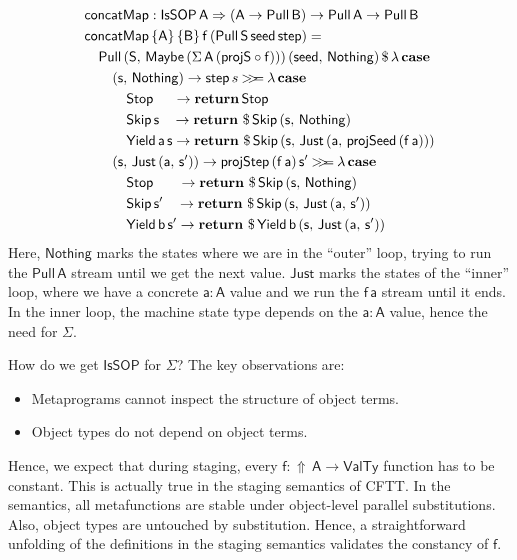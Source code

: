 \documentclass[acmsmall,screen,review,anonymous]{acmart}
\newcommand{\mit}[1]{{\mathsf{#1}}}
\newcommand{\msf}[1]{{\mathsf{#1}}}
\newcommand{\mbf}[1]{{\mathbf{#1}}}
\newcommand{\ind}{\hspace{1em}}
\newcommand{\return}{\mbf{return}\,}
\newcommand{\lam}{\lambda\,}
\newcommand{\vA}{\mathsf{A}}
\newcommand{\vB}{\mathsf{B}}
\newcommand{\vS}{\mathsf{S}}
\newcommand{\va}{\mathsf{a}}
\newcommand{\vb}{\mathsf{b}}
\newcommand{\vf}{\mathsf{f}}
\newcommand{\vs}{\mathsf{s}}
\newcommand{\IsSOP}{\msf{IsSOP}}
\newcommand{\case}{\mbf{case\,}}
\newcommand{\concatMap}{\msf{concatMap}}
\newcommand{\Lift}{{\Uparrow}}
\newcommand{\bind}{\mathbin{>\!\!>\mkern-6.7mu=}}
\newcommand{\VTy}{\msf{ValTy}}
\newcommand{\Maybe}{\msf{Maybe}}
\newcommand{\Nothing}{\msf{Nothing}}
\newcommand{\Just}{\msf{Just}}
\theoremstyle{remark}
\newcommand{\RA}{\Rightarrow}
\newcommand{\Stop}{\msf{Stop}}
\newcommand{\Skip}{\msf{Skip}}
\newcommand{\Yield}{\msf{Yield}}
\newcommand{\dlr}{\,\$\,}
\newcommand{\seed}{\mit{seed}}
\newcommand{\step}{\mit{step}}
\newcommand{\Pull}{\msf{Pull}}
\begin{document}
\begin{alignat*}{3}
  & \concatMap : \IsSOP\,\vA \RA (\vA \to \Pull\,\vB) \to \Pull\,\vA \to \Pull\,\vB \\
  & \concatMap\,\{\vA\}\,\{\vB\}\,\vf\,(\Pull\,\vS\,\seed\,\step) = \\
  & \ind \Pull\,(\vS,\,\Maybe\,(\Sigma\,\vA\,(\mit{projS} \circ \vf)))\,(\seed,\,\Nothing) \dlr \lam \case \\
  & \ind \ind (\vs,\,\Nothing) \to \step\,s \bind \lam \case \\
  & \ind \ind \ind \Stop      \hspace{1.4em}   \to \return \Stop\\
  & \ind \ind \ind \Skip\,\vs \hspace{0.9em} \to \return \dlr \Skip\,(\vs,\, \Nothing)\\
  & \ind \ind \ind \Yield\,\va\,\vs          \to \return \dlr \Skip\,(\vs,\, \Just\,(\va,\,\mit{projSeed}\,(\vf\,\va)))\\
  & \ind \ind (\vs,\,\Just\,(\va,\,\vs')) \to \mit{projStep}\,(\vf\,\va)\,\vs' \bind \lam \case \\
  & \ind \ind \ind \Stop       \hspace{1.75em}\to \return \dlr \Skip\,(\vs,\,\Nothing) \\
  & \ind \ind \ind \Skip\,\vs' \hspace{0.94em}\to \return \dlr \Skip\,(\vs,\,\Just\,(\va,\,\vs'))\\
  & \ind \ind \ind \Yield\,\vb\,\vs' \to \return \dlr \Yield\,\vb\,(\vs,\, \Just\,(\va,\,\vs'))\\
\end{alignat*}
Here, $\Nothing$ marks the states where we are in the ``outer'' loop, trying to
run the $\Pull\,\vA$ stream until we get the next value. $\Just$ marks the
states of the ``inner'' loop, where we have a concrete $\va : \vA$ value and
we run the $\vf\,\va$ stream until it ends. In the inner loop, the machine state
type depends on the $\va : \vA$ value, hence the need for $\Sigma$.

How do we get $\IsSOP$ for $\Sigma$? The key observations are:
\begin{itemize}
 \item Metaprograms cannot inspect the structure of object terms.
 \item Object types do not depend on object terms.
\end{itemize}
Hence, we expect that during staging, every $\vf : \Lift\,\vA \to \VTy$ function
has to be constant. This is actually true in the staging semantics of CFTT. In
the semantics, all metafunctions are stable under object-level parallel
substitutions. Also, object types are untouched by substitution. Hence, a
straightforward unfolding of the definitions in the staging semantics validates
the constancy of $\vf$.
\end{document}
